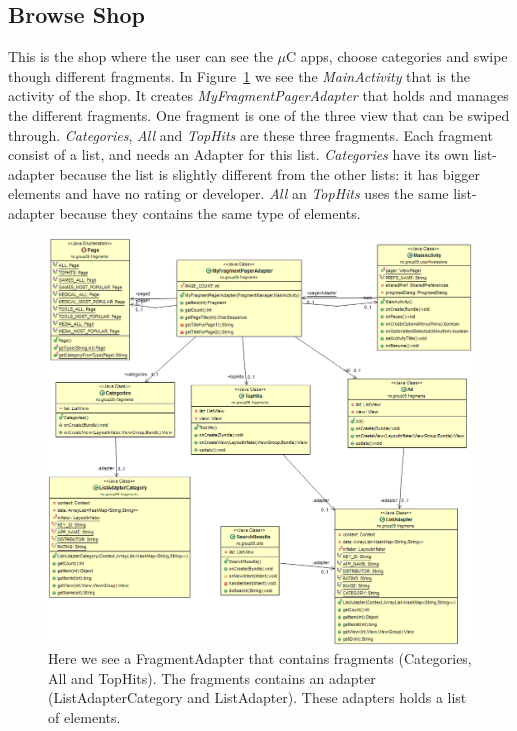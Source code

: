 	\subsection{Browse Shop}
	This is the shop where the user can see the $\mu$C apps, choose categories and swipe though different fragments. In  Figure~\ref{fig:maingui} we see the \textit{MainActivity} that is the activity of the shop. It creates \textit{MyFragmentPagerAdapter} that holds and manages the different fragments. One fragment is one of the three view that can be swiped through. \textit{Categories}, \textit{All} and \textit{TopHits} are these three fragments. Each fragment consist of a list, and needs an Adapter for this list. \textit{Categories} have its own list-adapter because the list is slightly different from the other lists: it has bigger elements and have no rating or developer. \textit{All} an \textit{TopHits} uses the same list-adapter because they contains the same type of elements.\\

	\begin{figure}[H]
	\hspace*{-1.1in}
	\includegraphics[scale=0.55]{images/UML/main.png}
	\caption[UML - Main GUI]{Here we see a FragmentAdapter that contains fragments (Categories, All and TopHits). The fragments contains an adapter (ListAdapterCategory and ListAdapter). These adapters holds a list of elements.}
	\label{fig:maingui}
	\end{figure}

